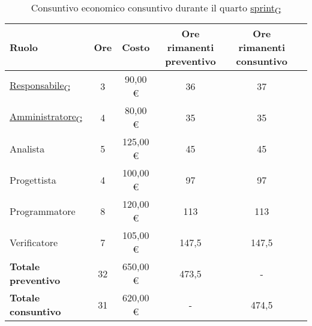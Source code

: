 \begin{table}[!h]
	\centering
	\begin{tabular}{ | l | c | c | c | c | c | }
		\hline
		\textbf{Ruolo}             & \textbf{Ore} & \textbf{Costo} & \textbf{Ore rimanenti preventivo} & \textbf{Ore rimanenti consuntivo} \\
		\hline
		\href{https://7last.github.io/docs/rtb/documentazione-interna/glossario\#responsabile}{Responsabile\textsubscript{G}}               & 3            & 90,00 €        & 36                                & 37                                \\
		\href{https://7last.github.io/docs/rtb/documentazione-interna/glossario\#amministratore}{Amministratore\textsubscript{G}}             & 4            & 80,00 €        & 35                                & 35                                \\
		Analista                   & 5            & 125,00 €       & 45                                & 45                                \\
		Progettista                & 4            & 100,00 €       & 97                                & 97                                \\
		Programmatore              & 8            & 120,00 €       & 113                               & 113                               \\
		Verificatore               & 7            & 105,00 €       & 147,5                             & 147,5                             \\
		\hline
		\textbf{Totale preventivo} & 32           & 650,00 €       & 473,5                             & -                                 \\
		\hline
		\textbf{Totale consuntivo} & 31           & 620,00 €       & -                                 & 474,5                             \\
		\hline
	\end{tabular}
	\caption{Consuntivo economico consuntivo durante il quarto \href{https://7last.github.io/docs/rtb/documentazione-interna/glossario\#sprint}{sprint\textsubscript{G}}}
	
\end{table}

